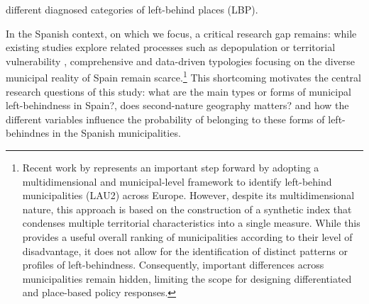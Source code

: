 \documentclass[a4paper,11pt,oneside]{article}
\begin{document}
different diagnosed categories of left-behind places (LBP).




In the Spanish context, on which we focus, a critical research gap remains: while existing studies explore related processes such as depopulation or territorial vulnerability \citep{gonzalez2023understanding}, comprehensive and data-driven typologies focusing on the diverse municipal reality of Spain remain scarce.\footnote{Recent work by \cite{Perancho2025} represents an important step forward by adopting a multidimensional and municipal-level framework to identify left-behind municipalities (LAU2) across Europe. However, despite its multidimensional nature, this approach is based on the construction of a synthetic index that condenses multiple territorial characteristics into a single measure. While this provides a useful overall ranking of municipalities according to their level of disadvantage, it does not allow for the identification of distinct patterns or profiles of left-behindness. Consequently, important differences across municipalities remain hidden, limiting the scope for designing differentiated and place-based policy responses.} This shortcoming motivates the central research questions of this study: what are the main types or forms of municipal left-behindness in Spain?, does second-nature geography matters? and how the different variables influence the probability of belonging to these forms of left-behindnes in the Spanish municipalities.
\end{document}
